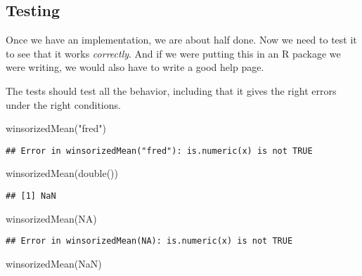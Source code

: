 \documentclass[
]{article}
\newenvironment{Shaded}{\begin{snugshade}}{\end{snugshade}}
\newcommand{\ConstantTok}[1]{\textcolor[rgb]{0.00,0.00,0.00}{#1}}
\newcommand{\FunctionTok}[1]{\textcolor[rgb]{0.00,0.00,0.00}{#1}}
\newcommand{\NormalTok}[1]{#1}
\newcommand{\StringTok}[1]{\textcolor[rgb]{0.31,0.60,0.02}{#1}}
\begin{document}
\hypertarget{testing}{%
\subsection{Testing}\label{testing}}

Once we have an implementation, we are about half done. Now we need to
test it to see that it works \emph{correctly}. And if we were putting
this in an R package we were writing, we would also have to write a good
help page.

The tests should test all the behavior, including that it gives the
right errors under the right conditions.

\begin{Shaded}
\begin{Highlighting}[]
\FunctionTok{winsorizedMean}\NormalTok{(}\StringTok{"fred"}\NormalTok{)}
\end{Highlighting}
\end{Shaded}

\begin{verbatim}
## Error in winsorizedMean("fred"): is.numeric(x) is not TRUE
\end{verbatim}

\begin{Shaded}
\begin{Highlighting}[]
\FunctionTok{winsorizedMean}\NormalTok{(}\FunctionTok{double}\NormalTok{())}
\end{Highlighting}
\end{Shaded}

\begin{verbatim}
## [1] NaN
\end{verbatim}

\begin{Shaded}
\begin{Highlighting}[]
\FunctionTok{winsorizedMean}\NormalTok{(}\ConstantTok{NA}\NormalTok{)}
\end{Highlighting}
\end{Shaded}

\begin{verbatim}
## Error in winsorizedMean(NA): is.numeric(x) is not TRUE
\end{verbatim}

\begin{Shaded}
\begin{Highlighting}[]
\FunctionTok{winsorizedMean}\NormalTok{(}\ConstantTok{NaN}\NormalTok{)}
\end{Highlighting}
\end{Shaded}
\end{document}
